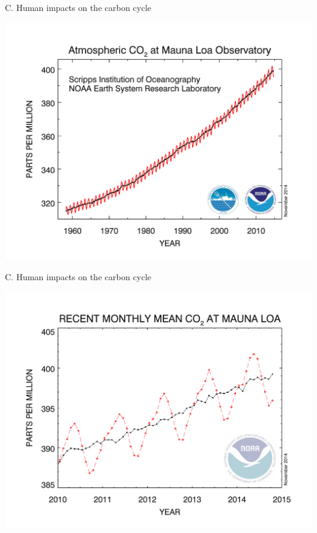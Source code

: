 \begin{frame}
    C. Human impacts on the carbon cycle \\

    \vspace{-7mm}
    \begin{center} 
        \includegraphics[width=\textwidth]{../images/co2-data-mauna-loa-observatory.pdf}
    \end{center}
\end{frame}

\begin{frame}
    C. Human impacts on the carbon cycle \\

    \vspace{-7mm}
    \begin{center} 
        \includegraphics[width=\textwidth]{../images/co2-trend-mauna-loa-observatory.pdf}
    \end{center}
\end{frame}

